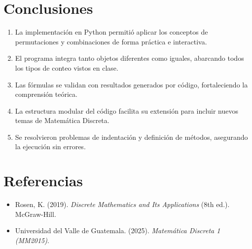 \documentclass[12pt]{article}
\begin{document}
\section{Conclusiones}
\begin{enumerate}
    \item La implementación en Python permitió aplicar los conceptos de permutaciones y combinaciones de forma práctica e interactiva.
    \item El programa integra tanto objetos diferentes como iguales, abarcando todos los tipos de conteo vistos en clase.
    \item Las fórmulas se validan con resultados generados por código, fortaleciendo la comprensión teórica.
    \item La estructura modular del código facilita su extensión para incluir nuevos temas de Matemática Discreta.
    \item Se resolvieron problemas de indentación y definición de métodos, asegurando la ejecución sin errores.
\end{enumerate}

\section{Referencias}
\begin{itemize}
    \item Rosen, K. (2019). \textit{Discrete Mathematics and Its Applications} (8th ed.). McGraw-Hill.
    \item Universidad del Valle de Guatemala. (2025). \textit{Matemática Discreta 1 (MM2015)}.
\end{itemize}
\end{document}

